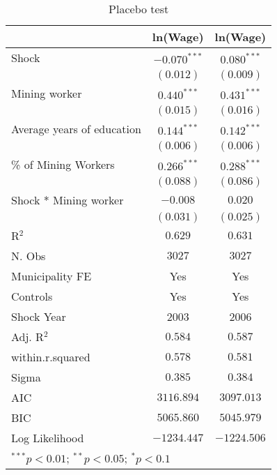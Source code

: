 
\begin{table}[H]
\caption{Placebo test}
\begin{center}
\begin{tabular}{l c c}
\hline
 & ln(Wage) & ln(Wage) \\
\hline
Shock                      & $-0.070^{***}$ & $0.080^{***}$ \\
                           & $(0.012)$      & $(0.009)$     \\
Mining worker              & $0.440^{***}$  & $0.431^{***}$ \\
                           & $(0.015)$      & $(0.016)$     \\
Average years of education & $0.144^{***}$  & $0.142^{***}$ \\
                           & $(0.006)$      & $(0.006)$     \\
\% of Mining Workers       & $0.266^{***}$  & $0.288^{***}$ \\
                           & $(0.088)$      & $(0.086)$     \\
Shock * Mining worker      & $-0.008$       & $0.020$       \\
                           & $(0.031)$      & $(0.025)$     \\
\hline
R$^2$                      & $0.629$        & $0.631$       \\
N. Obs                     & $3027$         & $3027$        \\
Municipality FE            & Yes            & Yes           \\
Controls                   & Yes            & Yes           \\
Shock Year                 & 2003           & 2006          \\
Adj. R$^2$                 & $0.584$        & $0.587$       \\
within.r.squared           & $0.578$        & $0.581$       \\
Sigma                      & $0.385$        & $0.384$       \\
AIC                        & $3116.894$     & $3097.013$    \\
BIC                        & $5065.860$     & $5045.979$    \\
Log Likelihood             & $-1234.447$    & $-1224.506$   \\
\hline
\multicolumn{3}{l}{\scriptsize{$^{***}p<0.01$; $^{**}p<0.05$; $^{*}p<0.1$}}
\end{tabular}
\label{table:coefficients}
\end{center}
\end{table}
